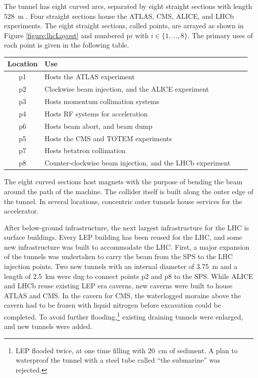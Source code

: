 The tunnel has eight curved arcs, separated by eight straight sections with length 528~m \cite{lyndon}.
Four straight sections house the ATLAS, CMS, ALICE, and LHCb experiments.
The eight straight sections, called points, are arrayed as shown in Figure \ref{figure:lhcLayout} and numbered p$i$ with $i\in\{1,...,8\}$.
The primary uses of each point is given in the following table.
\begin{center}
\begin{tabular}{c l l l}
\toprule
Location & Use \\
\midrule
    p1 & Hosts the ATLAS experiment \\
    p2 & Clockwise beam injection, and the ALICE experiment \\
    p3 & Hosts momentum collimation systems \\
    p4 & Hosts RF systems for acceleration \\
    p6 & Hosts beam abort, and beam dump \\
    p5 & Hosts the CMS and TOTEM experiments \\
    p7 & Hosts betatron collimation \\
    p8 & Counter-clockwise beam injection, and the LHCb experiment \\
\bottomrule
\end{tabular}
\end{center}
The eight curved sections host magnets with the purpose of bending the beam around the path of the machine.
The collider itself is built along the outer edge of the tunnel. In several locations, concentric outer tunnels house services for the accelerator.

After below-ground infrastructure, the next largest infrastructure for the LHC is surface buildings.
Every LEP building has been reused for the LHC, and some new infrastructure was built to accommodate the LHC.
First, a major expansion of the tunnels was undertaken to carry the beam from the SPS to the LHC injection points. Two new tunnels with an internal diameter of 3.75~m and a length of 2.5~km were dug to connect points p2 and p8 to the SPS.
While ALICE and LHCb reuse existing LEP era caverns, new caverns were built to house ATLAS and CMS.
In the cavern for CMS, the waterlogged moraine above the cavern had to be frozen with liquid nitrogen before excavation could be completed.
To avoid further flooding,\footnote{LEP flooded twice, at one time filling with 20~cm of sediment. A plan to waterproof the tunnel with a steel tube called ``the submarine'' was rejected.} existing draining tunnels were enlarged, and new tunnels were added.

